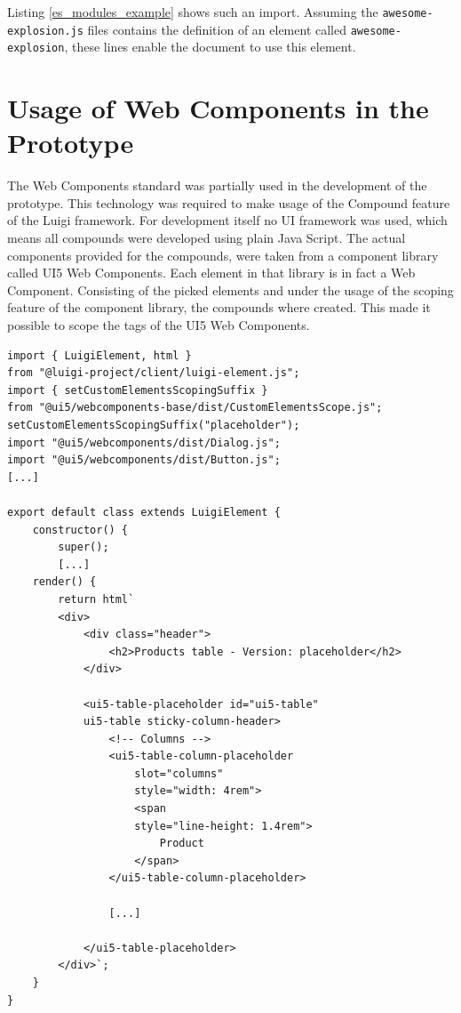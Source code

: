 Listing \ref{es_modules_example} shows such an import. Assuming the \texttt{awesome-explosion.js} files contains the definition of an element called \texttt{awesome-explosion}, these lines enable the document to use this element.\cite{wc_specifications}

\section{Usage of Web Components in the Prototype}

The Web Components standard was partially used in the development of the prototype. This technology was required to make usage of the Compound feature of the Luigi framework. \cite{luigi_wc} \cite{luigi_compound}
For development itself no UI framework was used, which means all compounds were developed using plain Java Script. The actual components provided for the compounds, were taken from a component library called UI5 Web Components. Each element in that library is in fact a Web Component.\cite{ui5_wc_github}
Consisting of the picked elements and under the usage of the scoping feature of the component library, the compounds where created. This made it possible to scope the tags of the UI5 Web Components.\cite{ui5_webcomponents_scoping}

\begin{lstlisting}[caption=Scoping feature used in the prototype, label=scoping_wc_prototype]
import { LuigiElement, html } 
from "@luigi-project/client/luigi-element.js";
import { setCustomElementsScopingSuffix } 
from "@ui5/webcomponents-base/dist/CustomElementsScope.js";
setCustomElementsScopingSuffix("placeholder");
import "@ui5/webcomponents/dist/Dialog.js";
import "@ui5/webcomponents/dist/Button.js";
[...]

export default class extends LuigiElement {
	constructor() {
		super();
		[...]
	render() {
		return html`
		<div>
			<div class="header">
				<h2>Products table - Version: placeholder</h2>
			</div>
			
			<ui5-table-placeholder id="ui5-table" 
			ui5-table sticky-column-header>
				<!-- Columns -->
				<ui5-table-column-placeholder 
					slot="columns" 
					style="width: 4rem">
					<span 
					style="line-height: 1.4rem">
						Product
					</span>
				</ui5-table-column-placeholder>
				
				[...]
				
			</ui5-table-placeholder>
		</div>`;
	}
}
\end{lstlisting}

